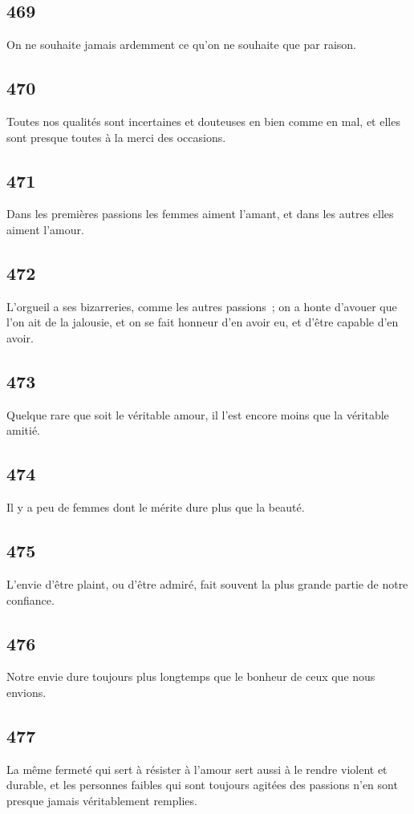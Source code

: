 \documentclass[french,twoside]{book} %
\begin{document}
\subsection[{469}]{ \textsc{469} }
\noindent On ne souhaite jamais ardemment ce qu’on ne souhaite que par raison.
\subsection[{470}]{ \textsc{470} }
\noindent Toutes nos qualités sont incertaines et douteuses en bien comme en mal, et elles sont presque toutes à la merci des occasions.
\subsection[{471}]{ \textsc{471} }
\noindent Dans les premières passions les femmes aiment l’amant, et dans les autres elles aiment l’amour.
\subsection[{472}]{ \textsc{472} }
\noindent L’orgueil a ses bizarreries, comme les autres passions ; on a honte d’avouer que l’on ait de la jalousie, et on se fait honneur d’en avoir eu, et d’être capable d’en avoir.
\subsection[{473}]{ \textsc{473} }
\noindent Quelque rare que soit le véritable amour, il l’est encore moins que la véritable amitié.
\subsection[{474}]{ \textsc{474} }
\noindent Il y a peu de femmes dont le mérite dure plus que la beauté.
\subsection[{475}]{ \textsc{475} }
\noindent L’envie d’être plaint, ou d’être admiré, fait souvent la plus grande partie de notre confiance.
\subsection[{476}]{ \textsc{476} }
\noindent Notre envie dure toujours plus longtemps que le bonheur de ceux que nous envions.
\subsection[{477}]{ \textsc{477} }
\noindent La même fermeté qui sert à résister à l’amour sert aussi à le rendre violent et durable, et les personnes faibles qui sont toujours agitées des passions n’en sont presque jamais véritablement remplies.
\end{document}
